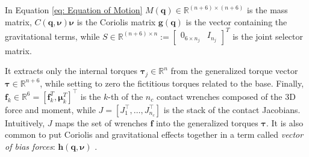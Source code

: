     In Equation \eqref{eq: Equation of Motion}  $ M( \mathbf{q}) \in \mathbb{R}^{(n+6) \times (n+6)}$ is the mass matrix, $C( \mathbf{q},\bm{\nu})\bm{\nu}$ is the Coriolis matrix $ \mathbf{g}( \mathbf{q})$ is the vector containing the gravitational terms, while $S \in \mathbb{R}^{(n+6) \times n} := \begin{bmatrix}
        0_{6 \times n_j} & I_{n_j}
    \end{bmatrix}^{T}$  is the joint selector matrix. 
    
    It extracts only the internal torques $\bm{\tau}_j \in \mathbb{R}^n$ from the generalized torque vector $\bm{\tau} \in \mathbb{R}^{n+6}$, while setting to zero the fictitious torques related to the base. 
    Finally, $ \mathbf{f}_k \in \mathbb{R}^6 = [\bm{f}_k^{T}, \bm{\mu}_k^{T}]^\top$ is the $k$-th of the $n_c$ contact wrenches composed of the 3D force and moment, while $J = [J_1^\top, \ldots, J_{n_c}^\top]$ is the stack of the contact Jacobians. Intuitively, $J$ maps the set of wrenches $\mathbf{f}$ into the generalized torques $\bm{\tau}$.
    It is also common to put Coriolis and gravitational effects together in a term called \textit{vector of bias forces}: $ {\mathbf{h}(\mathbf{q},\bm{\nu})}$ .
